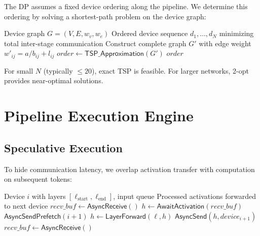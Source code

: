 \documentclass[11pt,a4paper]{article}
\begin{document}
The DP assumes a fixed device ordering along the pipeline. We determine this ordering by solving a shortest-path problem on the device graph:

\begin{algorithm}[H]
\caption{Pipeline Ordering}
\label{alg:ordering}
\begin{algorithmic}[1]
\Require Device graph $G = (V, E, w_v, w_e)$
\Ensure Ordered device sequence $d_1, \ldots, d_N$ minimizing total inter-stage communication
\State Construct complete graph $G'$ with edge weight $w'_{ij} = a / b_{ij} + l_{ij}$
\State $\mathit{order} \leftarrow \mathsf{TSP\_Approximation}(G')$ 
\State \Return $\mathit{order}$
\end{algorithmic}
\end{algorithm}

For small $N$ (typically $\leq 20$), exact TSP is feasible. For larger networks, 2-opt provides near-optimal solutions.

\section{Pipeline Execution Engine}

\subsection{Speculative Execution}

To hide communication latency, we overlap activation transfer with computation on subsequent tokens:

\begin{algorithm}[H]
\caption{Speculative Pipeline Execution (Per Device)}
\label{alg:speculative}
\begin{algorithmic}[1]
\Require Device $i$ with layers $[\ell_{\text{start}}, \ell_{\text{end}}]$, input queue
\Ensure Processed activations forwarded to next device
\State $\mathit{recv\_buf} \leftarrow \mathsf{AsyncReceive}()$ 
\Loop
    \State $h \leftarrow \mathsf{AwaitActivation}(\mathit{recv\_buf})$ 
    \State $\mathsf{AsyncSendPrefetch}(i+1)$ 
        \State $h \leftarrow \mathsf{LayerForward}(\ell, h)$
    \EndFor
    \State $\mathsf{AsyncSend}(h, \mathit{device}_{i+1})$ 
    \State $\mathit{recv\_buf} \leftarrow \mathsf{AsyncReceive}()$ 
\EndLoop
\end{algorithmic}
\end{algorithm}
\end{document}

